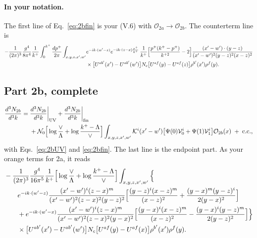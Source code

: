 \documentclass[10pt]{article}
\numberwithin{equation}{section}
\newcommand{\KK}{\mathcal K}
\newcommand{\Nz}{\mathcal N_0}
\newcommand{\OO}{\mathcal O}
\newcommand{\VV}{\mathcal V}
\begin{document}
\paragraph{In your notation.} The first line of Eq.~\eqref{eq:2bfin} is your (V.6) with $\OO_{2a}\to\OO_{2b}$. The counterterm line is
\begin{align}
-\frac{1}{(2\pi)^3}\frac{g^4}{8\pi^4}\frac{1}{k^+}\int_0^{k^+}\frac{dp^+}{2\pi}\int_{x,y,z,x',w'}&e^{-ik\cdot(w'-z)}e^{-ik\cdot(z-x)\frac{p^+}{k^+}}\,\frac{1}{k^+}\Big[\frac{p^+(k^+-p^+)}{k^{+2}}-2\Big]\frac{(x'-w')\cdot(y-z)}{(x'-w')^2(y-z)^2(x-z)^2}\notag\\
&\times\big[U^{ab'}(x')-U^{ab'}(w')\big]N_c\big[U^{af}(y)-U^{af}(z)\big]\rho^{b'}(x')\rho^f(y).
\end{align}

\subsection{Part 2b, complete}
\begin{align}
\frac{d^3N_{2b}}{d^3k}={}&\frac{d^3N_{2b}}{d^3k}\bigg|_{\rm UV}+\frac{d^3N_{2b}}{d^3k}\bigg|_{\rm fin}\notag\\
&+\Nz\Big[\log\frac{\vee}{\Lambda}+\log\frac{k^+-\Lambda}{\vee}\Big]\int_{x,y,z,x',w'}\KK^i(x'-w')\big[\Psi(0)\VV_0^i+\Psi(1)\VV_1^i\big]\OO_{2b}(x)\;+\;{\rm c.c.},
\label{eq:2bfinal}
\end{align}
with Eqs.~\eqref{eq:2bUV} and \eqref{eq:2bfin}. The last line is the endpoint part. As your orange terms for 2a, it reads
\begin{align}
&-\frac{1}{(2\pi)^3}\frac{g^4}{16\pi^5}\frac{1}{k^+}\Big[\log\frac{\vee}{\Lambda}+\log\frac{k^+-\Lambda}{\vee}\Big]\int_{x,y,z,x',w'}\Big\{\notag\\
&\qquad e^{-ik\cdot(w'-z)}\frac{(x'-w')^i(z-x)^m}{(x'-w')^2(z-x)^2(y-z)^2}\Big[\frac{(y-z)^i(x-z)^m}{(x-z)^2}+\frac{(y-x)^m(y-z)^i}{2(y-x)^2}\Big]\notag\\
&\qquad+e^{-ik\cdot(w'-x)}\frac{(x'-w')^i(z-x)^m}{(x'-w')^2(z-x)^2(y-x)^2}\Big[\frac{(y-x)^i(x-z)^m}{(x-z)^2}-\frac{(y-x)^i(y-z)^m}{2(y-z)^2}\Big]\Big\}\notag\\
&\qquad\times\big[U^{ab'}(x')-U^{ab'}(w')\big]N_c\big[U^{af}(y)-U^{af}(x)\big]\rho^{b'}(x')\rho^f(y).
\end{align}
\end{document}
